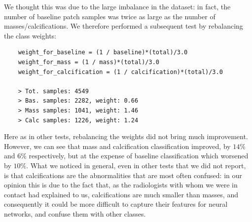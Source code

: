 \documentclass[11pt,a4paper,oneside]{article}
\begin{document}
We thought this was due to the large imbalance in the dataset: in fact, the number of baseline patch samples was twice as large as the number of masses/calcifications. We therefore performed a subsequent test by rebalancing the class weights:
\begin{verbatim}
    weight_for_baseline = (1 / baseline)*(total)/3.0 
    weight_for_mass = (1 / mass)*(total)/3.0
    weight_for_calcification = (1 / calcification)*(total)/3.0
    
    > Tot. samples: 4549
    > Bas. samples: 2282, weight: 0.66
    > Mass samples: 1041, weight: 1.46
    > Calc samples: 1226, weight: 1.24
\end{verbatim}

Here as in other tests, rebalancing the weights did not bring much improvement. However, we can see that mass and calcification classification improved, by $14\%$ and $6\%$ respectively, but at the expense of baseline classification which worsened by $10\%$. What we noticed in general, even in other tests that we did not report, is that calcifications are the abnormalities that are most often confused: in our opinion this is due to the fact that, as the radiologists with whom we were in contact had explained to us, calcifications are much smaller than masses, and consequently it could be more difficult to capture their features for neural networks, and confuse them with other classes.
\end{document}
